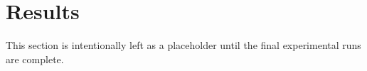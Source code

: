 \section{Results}

This section is intentionally left as a placeholder until the final experimental runs are complete.

